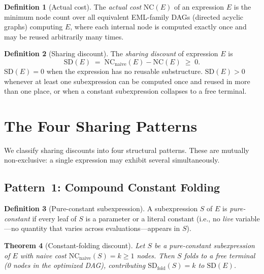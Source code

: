 \documentclass[12pt,a4paper]{article}
\newtheorem{theorem}{Theorem}[section]
\theoremstyle{definition}
\newtheorem{definition}[theorem]{Definition}
\newcommand{\NC}{\mathrm{NC}}
\newcommand{\SD}{\mathrm{SD}}
\begin{document}
\begin{definition}[Actual cost]\label{def:actual}
The \emph{actual cost} $\NC(E)$ of an expression $E$ is the minimum node
count over all equivalent EML-family DAGs (directed acyclic graphs) computing
$E$, where each internal node is computed exactly once and may be reused
arbitrarily many times.
\end{definition}

\begin{definition}[Sharing discount]\label{def:sd}
The \emph{sharing discount} of expression $E$ is
\[
  \SD(E) \;=\; \NC_{\mathrm{naive}}(E) - \NC(E) \;\geq\; 0.
\]
$\SD(E) = 0$ when the expression has no reusable substructure.
$\SD(E) > 0$ whenever at least one subexpression can be computed once and
reused in more than one place, or when a constant subexpression collapses
to a free terminal.
\end{definition}

\section{The Four Sharing Patterns}
\label{sec:patterns}

We classify sharing discounts into four structural patterns.
These are mutually non-exclusive: a single expression may exhibit several
simultaneously.

\subsection{Pattern~1: Compound Constant Folding}
\label{sec:p1}

\begin{definition}[Pure-constant subexpression]\label{def:pure-const}
A subexpression $S$ of $E$ is \emph{pure-constant} if every leaf of $S$
is a parameter or a literal constant (i.e., no \emph{live} variable---no
quantity that varies across evaluations---appears in $S$).
\end{definition}

\begin{theorem}[Constant-folding discount]\label{thm:cf}
Let $S$ be a pure-constant subexpression of $E$ with naive cost
$\NC_{\mathrm{naive}}(S) = k \geq 1$ nodes.  Then $S$ folds to a free
terminal (0 nodes in the optimized DAG), contributing
$\SD_{\mathrm{fold}}(S) = k$ to $\SD(E)$.
\end{theorem}
\end{document}
